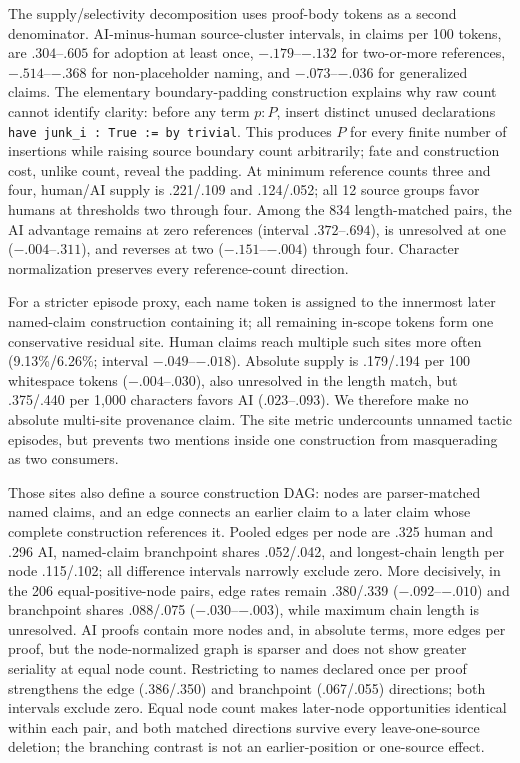 \documentclass[10pt]{article}
\newcommand{\code}[1]{\texttt{#1}}
\begin{document}
The supply/selectivity decomposition uses proof-body tokens as a second denominator.  AI-minus-human
source-cluster intervals, in claims per 100 tokens, are $.304$--$.605$ for adoption at least once,
$-.179$--$-.132$ for two-or-more references, $-.514$--$-.368$ for non-placeholder naming, and
$-.073$--$-.036$ for generalized claims.  The elementary boundary-padding construction explains
why raw count cannot identify clarity: before any term $p:P$, insert distinct unused declarations
\code{have junk\_i : True := by trivial}.  This produces $P$ for every finite number of insertions
while raising source boundary count arbitrarily; fate and construction cost, unlike count, reveal
the padding.  At minimum reference counts three and four, human/AI supply is .221/.109 and
.124/.052; all 12 source groups favor humans at thresholds two through four.  Among the 834
length-matched pairs, the AI advantage remains at zero references (interval $.372$--$.694$), is
unresolved at one ($-.004$--$.311$), and reverses at two ($-.151$--$-.004$) through four.
Character normalization preserves every reference-count direction.

For a stricter episode proxy, each name token is assigned to the innermost later named-claim
construction containing it; all remaining in-scope tokens form one conservative residual site.
Human claims reach multiple such sites more often (9.13\%/6.26\%; interval $-.049$--$-.018$).
Absolute supply is .179/.194 per 100 whitespace tokens ($-.004$--$.030$), also unresolved in the
length match, but .375/.440 per 1,000 characters favors AI ($.023$--$.093$).  We therefore make no
absolute multi-site provenance claim.  The site metric undercounts unnamed tactic episodes, but
prevents two mentions inside one construction from masquerading as two consumers.

Those sites also define a source construction DAG: nodes are parser-matched named claims, and an
edge connects an earlier claim to a later claim whose complete construction references it.  Pooled
edges per node are .325 human and .296 AI, named-claim branchpoint shares .052/.042, and longest-chain
length per node .115/.102; all difference intervals narrowly exclude zero.  More decisively, in the
206 equal-positive-node pairs, edge rates remain .380/.339 ($-.092$--$-.010$) and branchpoint shares
.088/.075 ($-.030$--$-.003$), while maximum chain length is unresolved.  AI proofs contain more
nodes and, in absolute terms, more edges per proof, but the node-normalized graph is sparser and does not show
greater seriality at equal node count.  Restricting to names declared once per proof strengthens the
edge (.386/.350) and branchpoint (.067/.055) directions; both intervals exclude zero.  Equal node
count makes later-node opportunities identical within each pair, and both matched directions survive
every leave-one-source deletion; the branching contrast is not an earlier-position or one-source effect.
\end{document}
